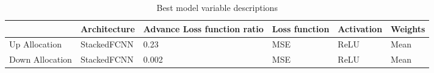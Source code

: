 \begin{table}[H] 
    \caption{Best model variable descriptions \label{chosen_models}}
    \begin{tabularx}{\textwidth}{CCCCCC}
    \toprule
    & \textbf{Architecture}	& \textbf{Advance Loss function ratio} & \textbf{Loss function} & \textbf{Activation} & \textbf{Weights}\\
    \midrule
    Up Allocation & StackedFCNN & 0.23 & MSE & ReLU & Mean \\
    Down Allocation & StackedFCNN & 0.002 & MSE & ReLU & Mean \\
        \bottomrule
    \end{tabularx}
\end{table}

